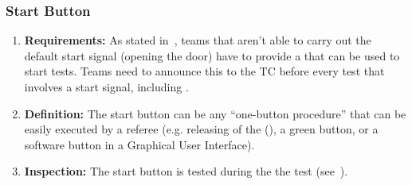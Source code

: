 \subsubsection{Start Button}
\label{rule:start_button}

\begin{enumerate}
	\item \textbf{Requirements:} As stated in~, teams that aren't able to carry out the default start signal (opening the door) have to provide a  that can be used to start tests.
	Teams need to announce this to the TC before every test that involves a start signal, including .

	\item \textbf{Definition:} The start button can be any \enquote{one-button procedure} that can be easily executed by a referee (e.g. releasing of the  (), a green button, or a software button in a Graphical User Interface).
	\item \textbf{Inspection:} The start button is tested during the the  test (see~).
\end{enumerate}









